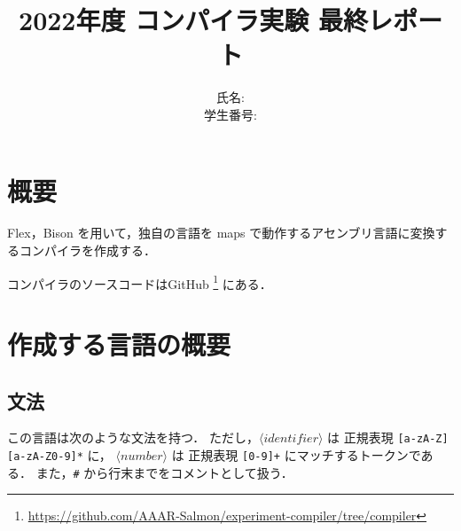 \documentclass[lualatex, a4paper, ja=standard]{bxjsarticle}
\title{2022年度 コンパイラ実験 最終レポート}
\author{氏名:  \\ 学生番号: }
\begin{document}
\maketitle

\section{概要}
Flex，Bison を用いて，独自の言語を
maps で動作するアセンブリ言語に変換するコンパイラを作成する．

コンパイラのソースコードはGitHub
\footnote{\url{https://github.com/AAAR-Salmon/experiment-compiler/tree/compiler}}
にある．

\section{作成する言語の概要}

\subsection{文法}

この言語は次のような文法を持つ．
ただし，$\langle\mathit{identifier}\rangle$ は
正規表現 \verb/[a-zA-Z][a-zA-Z0-9]*/ に，
$\langle\mathit{number}\rangle$ は
正規表現 \verb/[0-9]+/ にマッチするトークンである．
また，\verb'#' から行末までをコメントとして扱う．
\end{document}
